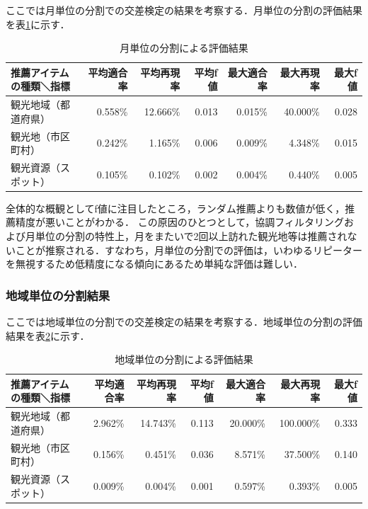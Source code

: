 \documentclass{jsarticle}
\begin{document}
ここでは月単位の分割での交差検定の結果を考察する．月単位の分割の評価結果を表\ref{result_monthly}に示す．

\begin{table}[!h]
\small
\caption{月単位の分割による評価結果}
\begin{center}
\begin{tabular}{lrrrrrr}
\label{result_monthly}
推薦アイテムの種類＼指標            & 平均適合率 & 平均再現率 & 平均f値 & 最大適合率 & 最大再現率 & 最大f値 \\ \hline
観光地域（都道府県）    & 0.558\% & 12.666\% & 0.013 & 0.015\% & 40.000\% & 0.028 \\
観光地（市区町村）      & 0.242\% &  1.165\% & 0.006 & 0.009\% &  4.348\% & 0.015 \\
観光資源（スポット）    & 0.105\% &  0.102\% & 0.002 & 0.004\% &  0.440\% & 0.005 \\
\end{tabular}
\end{center}
\end{table}

全体的な概観としてf値に注目したところ，ランダム推薦よりも数値が低く，推薦精度が悪いことがわかる．
この原因のひとつとして，協調フィルタリングおよび月単位の分割の特性上，月をまたいで2回以上訪れた観光地等は推薦されないことが推察される．すなわち，月単位の分割での評価は，いわゆるリピーターを無視するため低精度になる傾向にあるため単純な評価は難しい．

\subsubsection{地域単位の分割結果}

ここでは地域単位の分割での交差検定の結果を考察する．地域単位の分割の評価結果を表\ref{result_area}に示す．

\begin{table}[!h]
\small
\caption{地域単位の分割による評価結果}
\begin{center}
\begin{tabular}{lrrrrrr}
\label{result_area}
推薦アイテムの種類＼指標            & 平均適合率 & 平均再現率 & 平均f値 & 最大適合率 & 最大再現率 & 最大f値 \\ \hline
観光地域（都道府県）    & 2.962\% & 14.743\% & 0.113 & 20.000\% & 100.000\% & 0.333 \\
観光地（市区町村）      & 0.156\% &  0.451\% & 0.036 &  8.571\% &  37.500\% & 0.140 \\
観光資源（スポット）    & 0.009\% &  0.004\% & 0.001 &  0.597\% &   0.393\% & 0.005 \\
\end{tabular}
\end{center}
\end{table}
\end{document}
